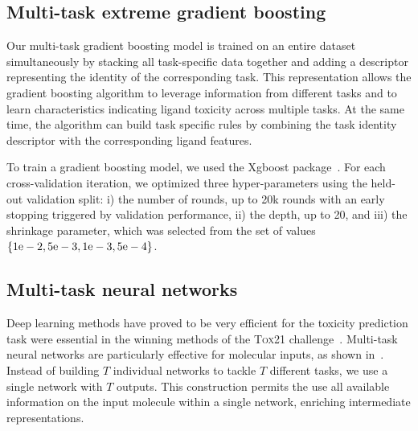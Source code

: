 \documentclass[11pt,a4paper]{article}
\begin{document}
\subsection{Multi-task extreme gradient boosting}
Our multi-task gradient boosting model is trained on an 
entire dataset simultaneously by stacking all task-specific data 
together and adding a descriptor representing the identity of the
corresponding task. This representation allows the gradient boosting algorithm to
leverage information from different tasks and to learn characteristics indicating ligand
toxicity across multiple tasks. At the same time, the algorithm can build task
specific rules by combining the task identity descriptor with the corresponding ligand
features. 

To train a gradient boosting model, we used the Xgboost package~\cite{Chen2016}.
For each cross-validation iteration, we optimized three hyper-parameters 
using the held-out validation split: 
i) the number of rounds, up to 20k rounds with
an early stopping triggered by validation performance, 
ii) the depth, up to 20, 
and  iii) the shrinkage parameter, which was selected from the set
of values $\left\{ 1{\rm e}-2, 5{\rm e}-3, 1{\rm e}-3, 5{\rm e}-4 \right\}$.

\subsection{Multi-task neural networks}
Deep learning methods have proved to be very efficient for the toxicity prediction task
were essential in the winning methods of 
the \textsc{Tox21} challenge~\cite{Mayr:2016aa,Capuzzi:2016aa}. 
Multi-task neural networks are particularly effective for molecular
inputs, as shown in~\cite{Ramsundar:2015aa}. Instead of building $T$ individual
networks to tackle $T$ different tasks, we use a single network with $T$ outputs. 
This construction permits the use all available information on the input 
molecule within a single network, enriching intermediate representations.
\end{document}
